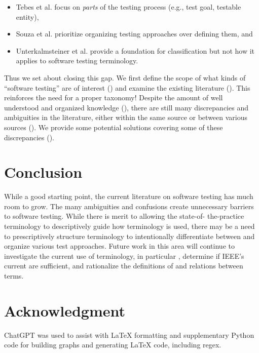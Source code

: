 \documentclass[conference]{IEEEtran}
\begin{document}
\begin{itemize}
    \item Tebes et al. \cite{TebesEtAl2020a} focus on \emph{parts} of the
          testing process (e.g., test goal, testable entity),
    \item Souza et al. \cite{SouzaEtAl2017} prioritize organizing testing
          approaches over defining them, and
    \item Unterkalmsteiner et al. \cite{UnterkalmsteinerEtAl2014} provide a
          foundation for classification but not how it applies to software
          testing terminology.
\end{itemize}

Thus we set about closing this gap. We first define the scope of what kinds of
``software testing'' are of interest () and examine the existing
literature (). This reinforces the need for a proper taxonomy!
Despite the amount of well understood and organized knowledge (),
there are still many discrepancies and ambiguities in the literature, either
within the same source or between various sources (). We provide
some potential solutions covering some of these discrepancies ().







\section{Conclusion}

While a good starting point, the current literature on software testing has
much room to grow. The many ambiguities and confusions create unnecessary
barriers to software testing. While there is merit to allowing the state-of-%
the-practice terminology to descriptively guide how terminology is used, there
may be a need to prescriptively structure terminology to intentionally
differentiate between and organize various test approaches. Future work in this
area will continue to investigate the current use of terminology, in
particular , determine if IEEE's current
 are sufficient, and rationalize the definitions of
and relations between terms.

\section*{Acknowledgment}

ChatGPT was used to assist with \LaTeX{} formatting and supplementary Python
code for building graphs and generating \LaTeX{} code, including regex.

\newpage



\end{document}
